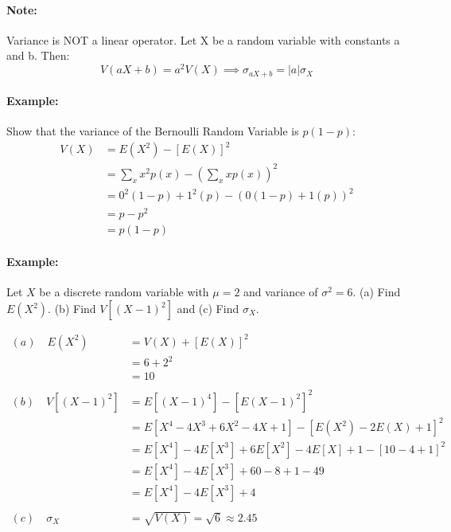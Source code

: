 \paragraph{Note:}
Variance is NOT a linear operator. Let X be a random variable with constants a and b. Then:
\[
    V(aX + b) = a^2 V(X) \implies \sigma_{aX + b} = |a| \sigma_X
\]

\paragraph*{Example:}
Show that the variance of the Bernoulli Random Variable is $p(1-p)$:
\begin{align*}
    V(X) &= E(X^2) - [E(X)]^2 \\
    &= \sum_x x^2 p(x) - \left(\sum_x x p(x)\right)^2 \\
    &= 0^2(1-p) + 1^2(p) - (0(1-p) + 1(p))^2 \\
    &= p - p^2 \\
    &= p(1-p)
\end{align*}

\paragraph*{Example:}
Let $X$ be a discrete random variable with $\mu = 2$ and variance of $\sigma^2 = 6$. (a) Find $E(X^2)$. (b) Find $V[(X-1)^2]$ and (c) 
Find $\sigma_X$.

\begin{align*}
    (a) \quad E(X^2) &= V(X) + [E(X)]^2 \\
    &= 6 + 2^2 \\
    &= 10 \\
    \\
    (b) \quad V[(X-1)^2] &= E[(X-1)^4] - [E(X-1)^2]^2 \\
    &= E[X^4 - 4X^3 + 6X^2 - 4X + 1] - [E(X^2) - 2E(X) + 1]^2 \\
    &= E[X^4] - 4E[X^3] + 6E[X^2] - 4E[X] + 1 - [10 - 4 + 1]^2 \\
    &= E[X^4] - 4E[X^3] + 60 - 8 + 1 - 49 \\
    &= E[X^4] - 4E[X^3] + 4 \\
    \\
    (c) \quad \sigma_X &= \sqrt{V(X)} = \sqrt{6} \approx 2.45
\end{align*}